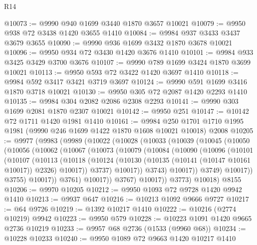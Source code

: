 \begin{lexlean}{R14}
\begin{coremodule}
@10073 := @9990 @940 @1699 @3440 @1870 @3657 @10021
@10079 := @9950 @938 @72 @3438 @1420 @3655 @1410
@10084 := @9984 @937 @3433 @3437 @3679 @3655
@10090 := @9990 @936 @1699 @3432 @1870 @3678 @10021
@10096 := @9950 @934 @72 @3430 @1420 @3676 @1410
@10101 := @9984 @933 @3425 @3429 @3700 @3676
@10107 := @9990 @789 @1699 @3424 @1870 @3699 @10021
@10113 := @9950 @593 @72 @3422 @1420 @3697 @1410
@10118 := @9984 @592 @3417 @3421 @3719 @3697
@10124 := @9990 @591 @1699 @3416 @1870 @3718 @10021
@10130 := @9950 @305 @72 @2087 @1420 @2293 @1410
@10135 := @9984 @304 @2082 @2086 @2308 @2293
@10141 := @9990 @303 @1699 @2081 @1870 @2307 @10021
@10142 := @9950 @251
@10147 := @10142 @72 @1711 @1420 @1981 @1410
@10161 := @9984
    @250
    @1701
    @1710
    @1995
    @1981
    (@9990 @246 @1699 @1422 @1870 @1608 @10021 @10018)
    @2008
@10205 := @9977
    (@9983
      (@9989
        (@10022
          (@10028
            (@10033
              (@10039
                (@10045
                  (@10050
                    (@10056
                      (@10062
                        (@10067
                          (@10073
                            (@10079
                              (@10084
                                (@10090
                                  (@10096
                                    (@10101
                                      (@10107
                                        (@10113
                                          (@10118
                                            (@10124
                                              (@10130
                                                (@10135 (@10141 (@10147 @10161 @10017)) @2326)
                                                @10017))
                                            @3737)
                                          @10017))
                                      @3743)
                                    @10017))
                                @3749)
                              @10017))
                          @3755)
                        @10017))
                    @3761)
                  @10017))
              @3767)
            @10017))
        @3773)
      @10018)
    @8155
@10206 := @9970 @10205
@10212 := @9950 @1093 @72 @9728 @1420 @9942 @1410
@10213 := @9937 @647
@10216 := @10213 @1092 @9666 @9727
@10217 := @64 @9726
@10219 := @1392 @10217 @1410
@10222 := @10216 (@2774 @10219) @9942
@10223 := @9950 @579
@10228 := @10223 @1091 @1420 @9665 @2736 @10219
@10233 := @9957 @68 @2736 (@1533 (@9960 @68))
@10234 := @10228 @10233
@10240 := @9950 @1089 @72 @9663 @1420 @10217 @1410

\end{coremodule}
\end{lexlean}
